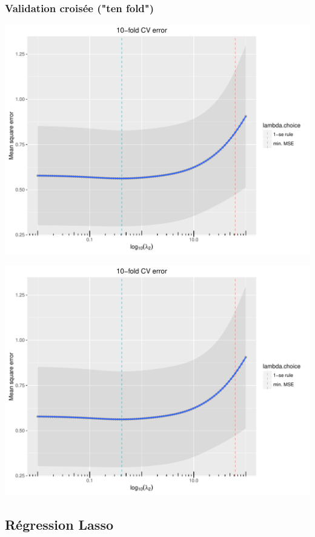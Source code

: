 \documentclass{beamer}\usepackage[]{graphicx}\usepackage[]{color}
\newenvironment{knitrout}{}{} %
\begin{document}
\begin{frame}[containsverbatim]
  \frametitle{Validation croisée ("ten fold")}
\begin{knitrout}\scriptsize
{}\color{fgcolor}
\includegraphics[width=\textwidth]{figures/toy_ridgeunnamed-chunk-57-1} 

\includegraphics[width=\textwidth]{figures/toy_ridgeunnamed-chunk-57-2} 

\end{knitrout}
\end{frame}






\subsection{Régression Lasso}
\end{document}
